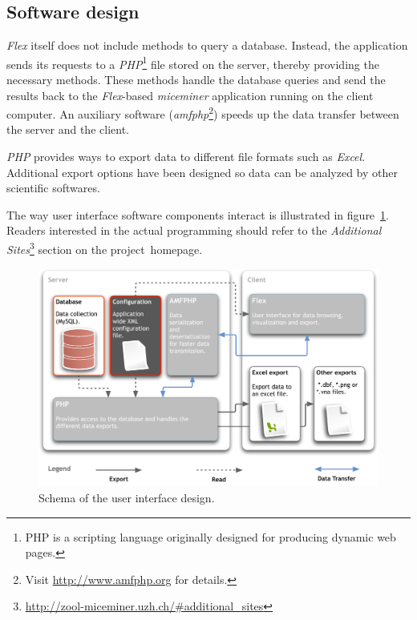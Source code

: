 \subsection{Software design}
\label{subsec:miceminer_design}   

\textit{Flex} itself does not include methods to query a database. Instead, the application sends its requests to a \textit{PHP}\footnote{PHP is a scripting language originally designed for producing dynamic web pages\citep{wiki:php}.} file stored on the server, thereby providing the necessary methods. These methods handle the database queries and send the results back to the \textit{Flex}-based \textit{miceminer} application running on the client computer. An auxiliary software (\textit{amfphp}\footnote{Visit \href{http://www.amfphp.org}{http://www.amfphp.org} for details.}) speeds up the data transfer between the server and the client.

\textit{PHP} provides ways to export data to different file formats such as \textit{Excel}. Additional export options have been designed so data can be analyzed by other scientific softwares.

The way user interface software components interact is illustrated in figure~\ref{fig:app_design_miceminer}. Readers interested in the actual programming should refer to the \textit{Additional Sites}\footnote{\href{http://zool-miceminer.uzh.ch/\#additional_sites}{http://zool-miceminer.uzh.ch/\#additional\_sites}} section on the project~homepage.   

\begin{figure}[htpb]
\begin{center}
  \includegraphics[width=\textwidth]{assets/pdf/application_design_miceminer.pdf}
  \caption[Schema of the user interface design]{Schema of the user interface design.}
  \label{fig:app_design_miceminer}
\end{center}
\end{figure}

